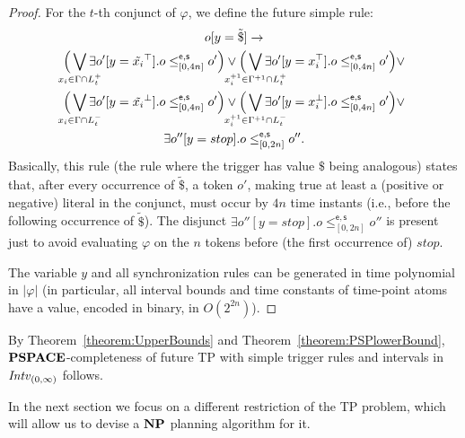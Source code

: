 \begin{proof}
For the $t$-th conjunct of $\varphi$, %
we define the future simple rule:
\begin{multline*}
    o[y=\tilde{\$}]\to \\
    \Big(\smashoperator{\bigvee_{x_i\in \Gamma\cap L^+_t}} \exists o'[y=\tilde{x_i}^\top]. o\leq ^{\mathsf{e},\mathsf{s}}_{[0,4n]} o' \Big) \vee 
        \Big(\smashoperator{\bigvee_{x_i^{+1}\in \Gamma^{+1}\cap L^+_t}} \exists o'[y=x_i^\top]. o\leq ^{\mathsf{e},\mathsf{s}}_{[0,4n]} o' \Big) \vee \\
        \Big(\smashoperator{\bigvee_{x_i\in \Gamma\cap L^-_t}} \exists o'[y=\tilde{x_i}^\bot]. o\leq ^{\mathsf{e},\mathsf{s}}_{[0,4n]} o' \Big) \vee 
        \Big(\smashoperator{\bigvee_{x_i^{+1}\in \Gamma^{+1}\cap L^-_t}} \exists o'[y=x_i^\bot]. o\leq ^{\mathsf{e},\mathsf{s}}_{[0,4n]} o' \Big) \vee \\
        \exists o''[y=stop]. o\leq ^{\mathsf{e},\mathsf{s}}_{[0,2n]} o''.
\end{multline*}
Basically, this rule (the rule where the trigger has value $\$$ being analogous) states that, after every occurrence of $\tilde{\$}$, a token $o'$, making true at least a (positive or negative) literal in the conjunct, must occur by $4n$ time instants (i.e., before the following occurrence of $\tilde{\$}$).
The disjunct $\exists o''[y=stop]. o\leq ^{\mathsf{e},\mathsf{s}}_{[0,2n]} o'' $ is present just to avoid evaluating $\varphi$ on the $n$ tokens before (the first occurrence of) $stop$.

The variable $y$ and all synchronization rules can be generated in time polynomial in $|\varphi|$ (in particular, all interval bounds and time constants of time-point atoms have a value, encoded in binary, in $O(2^{2n})$).
\end{proof}

By Theorem~\ref{theorem:UpperBounds} and Theorem~\ref{theorem:PSPlowerBound}, $\textbf{PSPACE}$-completeness of 
future TP with simple trigger rules and intervals in ${\mathit{Intv}}_{(0,\infty)}$ follows.

In the next section we focus on a different restriction of the TP problem, which will allow us to devise a $\textbf{NP}$ planning algorithm for it.